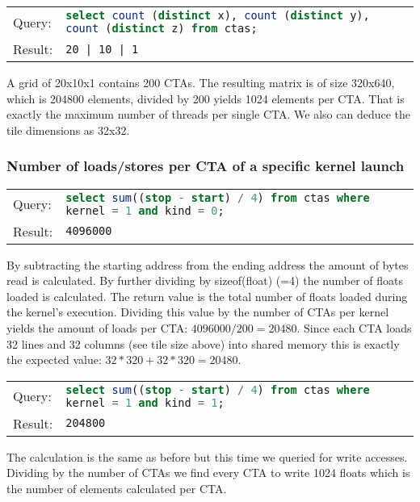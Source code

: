 \documentclass{scrartcl}
\begin{document}
\begin{tabularx}{\textwidth}{l X}
Query: & \lstinline[language=sql]{select count (distinct x), count (distinct y), count (distinct z) from ctas;} \\ 
Result: & \lstinline{20 | 10 | 1}
\end{tabularx}

\smallskip

A grid of 20x10x1 contains 200 CTAs. The resulting matrix is of size 320x640, 
which is 204800 elements, divided by 200 yields 1024 elements per CTA. That is exactly the maximum number of threads per single CTA. We also can deduce the tile dimensions as 32x32.

\subsubsection*{Number of loads/stores per CTA of a specific kernel launch}

\begin{tabularx}{\textwidth}{l X}
Query: & \lstinline[language=sql]{select sum((stop - start) / 4) from ctas where kernel = 1 and kind = 0;} \\ 
Result: & \lstinline{4096000}
\end{tabularx}

\smallskip

By subtracting the starting address from the ending address the amount of bytes read is calculated. By further dividing by sizeof(float) (=4) the number of floats loaded is calculated.
The return value is the total number of floats loaded during the kernel’s execution.
Dividing this value by the number of CTAs per kernel yields the amount of loads per CTA:
$4096000 / 200 = 20480$.
Since each CTA loads 32 lines and 32 columns (see tile size above) into shared memory this is exactly the expected value: $32 * 320 + 32 * 320 = 20480$.\\

\smallskip

\noindent\begin{tabularx}{\textwidth}{l X}
Query: & \lstinline[language=sql]{select sum((stop - start) / 4) from ctas where kernel = 1 and kind = 1;} \\ 
Result: & \lstinline{204800}
\end{tabularx}

\smallskip

The calculation is the same as before but this time we queried for write accesses.
Dividing by the number of CTAs we find every CTA to write 1024 floats which is the number of elements calculated per CTA.
\end{document}
